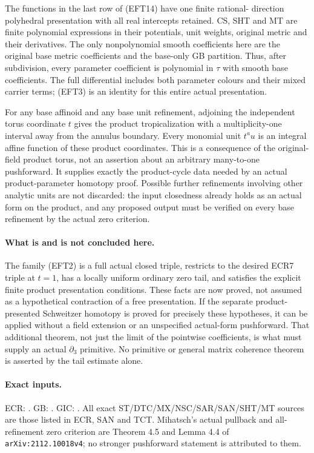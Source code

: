 The functions in the last row of (EFT14) have one finite rational-
direction polyhedral presentation with all real intercepts
retained.  CS, SHT and MT are finite polynomial expressions
in their potentials, unit weights, original metric and their
derivatives.  The only nonpolynomial smooth coefficients here
are the original base metric coefficients and the base-only GB
partition.  Thus, after subdivision, every parameter coefficient
is polynomial in $\tau$ with smooth base coefficients.  The
full differential includes both parameter colours and their
mixed carrier terms; (EFT3) is an identity for this entire
actual presentation.

For any base affinoid and any base unit refinement, adjoining
the independent torus coordinate $t$ gives the product
tropicalization with a multiplicity-one interval away from
the annulus boundary.  Every monomial unit $t^a u$ is an
integral affine function of these product coordinates.
This is a consequence of the original-field product torus,
not an assertion about an arbitrary many-to-one pushforward.
It supplies exactly the product-cycle data needed by an
actual product-parameter homotopy proof.  Possible further
refinements involving other analytic units are not discarded:
the input closedness already holds as an actual form on
the product, and any proposed output must be verified on
every base refinement by the actual zero criterion.

\paragraph{What is and is not concluded here.}
The family (EFT2) is a full actual closed triple, restricts to
the desired ECR7 triple at $t=1$, has a locally uniform
ordinary zero tail, and satisfies the explicit finite product
presentation conditions.  These facts are now proved, not
assumed as a hypothetical contraction of a free presentation.
If the separate product-presented Schweitzer homotopy is
proved for precisely these hypotheses, it can be applied
without a field extension or an unspecified actual-form
pushforward.  That additional theorem, not just the limit
of the pointwise coefficients, is what must supply an actual
$\partial_3$ primitive.  No primitive or general matrix
coherence theorem is asserted by the tail estimate alone.

\paragraph{Exact inputs.}
ECR: .
GB: .
GIC: .
All exact ST/DTC/MX/NSC/SAR/SAN/SHT/MT sources are those listed
in ECR, SAN and TCT.  Mihatsch's actual pullback and all-refinement
zero criterion are Theorem 4.5 and Lemma 4.4 of
\texttt{arXiv:2112.10018v4}; no stronger pushforward statement
is attributed to them.
